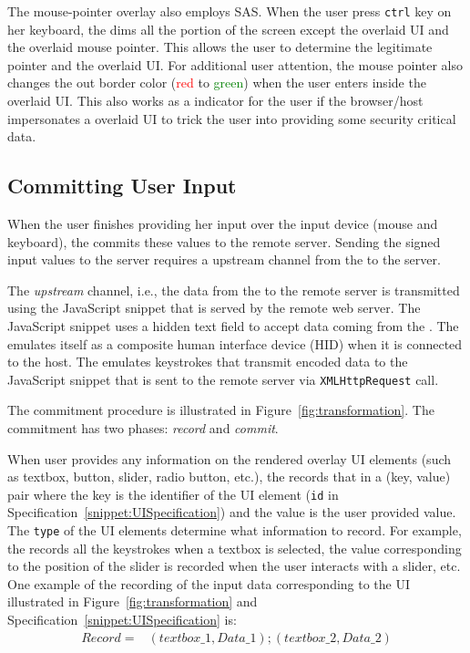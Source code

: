  The mouse-pointer overlay also employs SAS. When the user press \texttt{ctrl} key on her keyboard, the \device dims all the portion of the screen except the overlaid UI and the overlaid mouse pointer. This allows the user to determine the legitimate pointer and the overlaid UI. For additional user attention, the mouse pointer also changes the out border color (\textcolor{red}{red} to \textcolor{green}{green}) when the user enters inside the overlaid UI. This also works as a indicator for the user if the browser/host impersonates a overlaid UI to trick the user into providing some security critical data.
 

\subsection{Committing User Input}
\label{sec:systemDesign:commit}

When the user finishes providing her input over the input device (mouse and keyboard), the \device commits these values to the remote server.
Sending the signed input values to the server requires a upstream channel from the \device to the server.

 The \emph{upstream} channel, i.e., the data from the \device to the remote server is transmitted using the \name JavaScript snippet that is served by the remote web server. The \name JavaScript snippet uses a hidden text field to accept data coming from the \device. The \device emulates itself as a composite human interface device (HID) when it is connected to the host. The \device emulates keystrokes that transmit encoded data to the \name JavaScript snippet that is sent to the remote server via \texttt{XMLHttpRequest} call.

The commitment procedure is illustrated in Figure~\ref{fig:transformation}. The commitment has two phases: \emph{record} and \emph{commit}.

 When user provides any information on the rendered overlay UI elements (such as textbox, button, slider, radio button, etc.), the \device records that in a (key, value) pair where the key is the identifier of the UI element (\texttt{id} in Specification~\ref{snippet:UISpecification}) and the value is the user provided value. The \texttt{type} of the UI elements determine what information to record. For example, the \device records all the keystrokes when a textbox is selected, the value corresponding to the position of the slider is recorded when the user interacts with a slider, etc. One example of the recording of the input data corresponding to the UI illustrated in Figure~\ref{fig:transformation} and Specification~\ref{snippet:UISpecification} is: 
\begin{align*}
Record = & (textbox\_1, Data\_1);(textbox\_2,Data\_2)
\end{align*}

